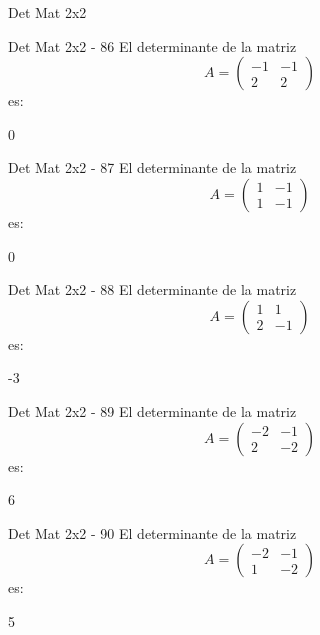 \documentclass[a4,11pt]{aleph-notas}
\begin{document}
\begin{quiz}{Det Mat 2x2}
\begin{numerical}[tolerance=0]%
    {Det Mat 2x2 - 86}
    El determinante de la matriz
    \[
        A = \begin{pmatrix} -1 & -1 \\ 2 & 2 \end{pmatrix}
    \]
    es:
    \item[] 0
\end{numerical}

\begin{numerical}[tolerance=0]%
    {Det Mat 2x2 - 87}
    El determinante de la matriz
    \[
        A = \begin{pmatrix} 1 & -1 \\ 1 & -1 \end{pmatrix}
    \]
    es:
    \item[] 0
\end{numerical}

\begin{numerical}[tolerance=0]%
    {Det Mat 2x2 - 88}
    El determinante de la matriz
    \[
        A = \begin{pmatrix} 1 & 1 \\ 2 & -1 \end{pmatrix}
    \]
    es:
    \item[] -3
\end{numerical}

\begin{numerical}[tolerance=0]%
    {Det Mat 2x2 - 89}
    El determinante de la matriz
    \[
        A = \begin{pmatrix} -2 & -1 \\ 2 & -2 \end{pmatrix}
    \]
    es:
    \item[] 6
\end{numerical}

\begin{numerical}[tolerance=0]%
    {Det Mat 2x2 - 90}
    El determinante de la matriz
    \[
        A = \begin{pmatrix} -2 & -1 \\ 1 & -2 \end{pmatrix}
    \]
    es:
    \item[] 5
\end{numerical}


\end{quiz}
\end{document}
